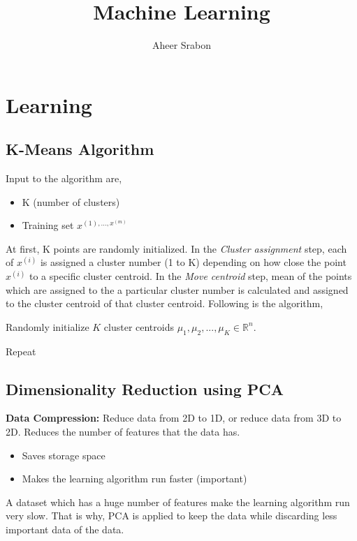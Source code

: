 

\title{Machine Learning}
\author{Aheer Srabon}


\maketitle

\section*{Learning}

\subsection*{K-Means Algorithm}
\noindent Input to the algorithm are,
\begin{itemize}
\itemsep0em
	\item K (number of clusters)
	\item Training set $ {x^{(1), ..., x^{(m)}}} $
\end{itemize}

\noindent At first, K points are randomly initialized. In the \emph{Cluster assignment} step, each
of $ x^{(i)} $ is assigned a cluster number (1 to K) depending on how close the point $ x^{(i)} $
to a specific cluster centroid. In the \emph{Move centroid} step, mean of the points which are
assigned to the a particular cluster number is calculated and assigned to the cluster centroid of that
cluster centroid. Following is the algorithm,

\noindent Randomly initialize $ K $ cluster centroids $ \mu_1, \mu_2, ... , \mu_K \in \mathbb{R}^n $.

\begin{algorithmic}
	Repeat {
		
	}
\end{algorithmic}

\subsection*{Dimensionality Reduction using PCA}
\noindent \textbf{Data Compression: } Reduce data from 2D to 1D,
or reduce data from 3D to 2D. Reduces the number of features
that the data has.
\begin{itemize}
\itemsep0em
	\item Saves storage space
	\item Makes the learning algorithm run faster (important)
\end{itemize}
\vspace{0.5em}
\noindent A dataset which has a huge number of features make the
learning algorithm run very slow. That is why, PCA is applied to
keep the data while discarding less important data of the data.

